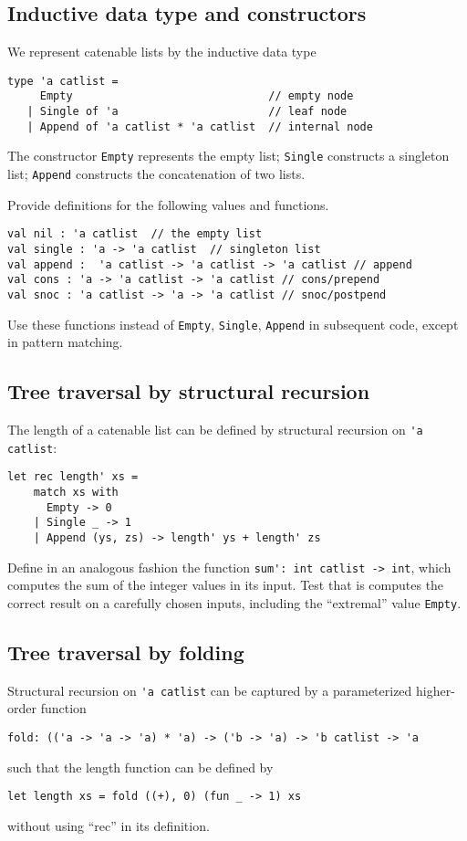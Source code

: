 \documentclass[a4paper,11pt]{article}
\begin{document}
\subsection{Inductive data type and constructors}

We represent catenable lists by the inductive data type 
\begin{verbatim}
type 'a catlist = 
     Empty                              // empty node
   | Single of 'a                       // leaf node
   | Append of 'a catlist * 'a catlist  // internal node
\end{verbatim}
The constructor \texttt{Empty} represents the empty list; \texttt{Single} constructs a singleton list; \texttt{Append} constructs the concatenation of two lists.

Provide definitions for the following values and functions. 
\begin{verbatim}
val nil : 'a catlist  // the empty list
val single : 'a -> 'a catlist  // singleton list
val append :  'a catlist -> 'a catlist -> 'a catlist // append
val cons : 'a -> 'a catlist -> 'a catlist // cons/prepend
val snoc : 'a catlist -> 'a -> 'a catlist // snoc/postpend
\end{verbatim}
Use these functions instead of \verb|Empty|, \verb|Single|, \verb|Append| in subsequent code, except in pattern matching.

\subsection{Tree traversal by structural recursion}

The length of a catenable list can be defined by structural recursion on \verb|'a catlist|:
\begin{verbatim}
let rec length' xs =
    match xs with
      Empty -> 0
    | Single _ -> 1
    | Append (ys, zs) -> length' ys + length' zs
\end{verbatim}

Define in an analogous fashion the function \verb|sum': int catlist -> int|, which computes the sum of the integer values in its
input. Test that is computes the correct result on a carefully chosen inputs, including the ``extremal'' value \verb|Empty|.

\subsection{Tree traversal by folding}

Structural recursion on \verb|'a catlist| can be captured by a parameterized higher-order function
\begin{verbatim}
fold: (('a -> 'a -> 'a) * 'a) -> ('b -> 'a) -> 'b catlist -> 'a
\end{verbatim}
such that the length function can be defined by
\begin{verbatim}
let length xs = fold ((+), 0) (fun _ -> 1) xs
\end{verbatim}
without using ``rec'' in its definition.
\end{document}
